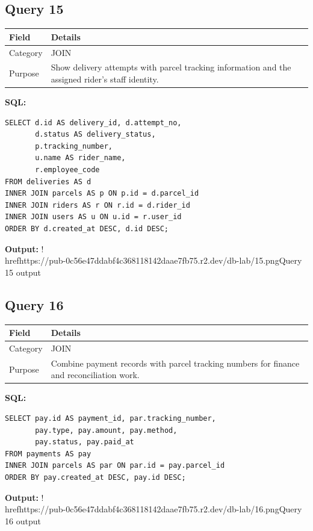 \documentclass[11pt,a4paper]{article}
\begin{document}
\subsection{Query 15}
\begin{tabularx}{\linewidth}{>{\raggedright\arraybackslash}X|>{\raggedright\arraybackslash}X}
\hline
\textbf{Field} & \textbf{Details} \\ 
\hline
Category & JOIN \\ 
\hline
Purpose & Show delivery attempts with parcel tracking information and the assigned rider's staff identity. \\ 
\hline
\end{tabularx}
\textbf{SQL:}
\begin{lstlisting}
SELECT d.id AS delivery_id, d.attempt_no,
       d.status AS delivery_status,
       p.tracking_number,
       u.name AS rider_name,
       r.employee_code
FROM deliveries AS d
INNER JOIN parcels AS p ON p.id = d.parcel_id
INNER JOIN riders AS r ON r.id = d.rider_id
INNER JOIN users AS u ON u.id = r.user_id
ORDER BY d.created_at DESC, d.id DESC;
\end{lstlisting}
\textbf{Output:}
!\\href{https://pub-0c56e47ddabf4c368118142daae7fb75.r2.dev/db-lab/15.png}{Query 15 output}
\subsection{Query 16}
\begin{tabularx}{\linewidth}{>{\raggedright\arraybackslash}X|>{\raggedright\arraybackslash}X}
\hline
\textbf{Field} & \textbf{Details} \\ 
\hline
Category & JOIN \\ 
\hline
Purpose & Combine payment records with parcel tracking numbers for finance and reconciliation work. \\ 
\hline
\end{tabularx}
\textbf{SQL:}
\begin{lstlisting}
SELECT pay.id AS payment_id, par.tracking_number,
       pay.type, pay.amount, pay.method,
       pay.status, pay.paid_at
FROM payments AS pay
INNER JOIN parcels AS par ON par.id = pay.parcel_id
ORDER BY pay.created_at DESC, pay.id DESC;
\end{lstlisting}
\textbf{Output:}
!\\href{https://pub-0c56e47ddabf4c368118142daae7fb75.r2.dev/db-lab/16.png}{Query 16 output}
\end{document}
